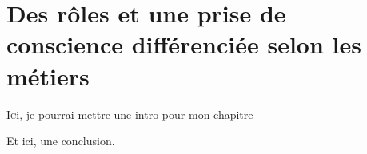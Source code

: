 \chapter[PDV métier]{\label{II-B}Des rôles et une prise de conscience différenciée selon les métiers }

\lettrine{I}ci, je pourrai mettre une intro pour mon chapitre






\bigskip
\bigskip
\bigskip

Et ici, une conclusion.